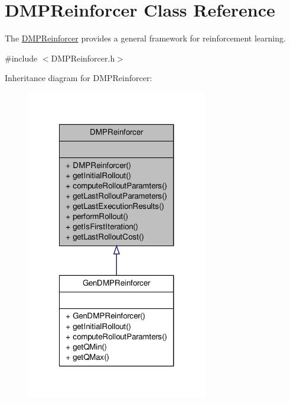 \hypertarget{classDMPReinforcer}{\section{\-D\-M\-P\-Reinforcer \-Class \-Reference}
\label{classDMPReinforcer}
}


\-The \hyperlink{classDMPReinforcer}{\-D\-M\-P\-Reinforcer} provides a general framework for reinforcement learning.  




{\ttfamily \#include $<$\-D\-M\-P\-Reinforcer.\-h$>$}



\-Inheritance diagram for \-D\-M\-P\-Reinforcer\-:
\nopagebreak
\begin{figure}[H]
\begin{center}
\leavevmode
\includegraphics[width=224pt]{classDMPReinforcer__inherit__graph}
\end{center}
\end{figure}

